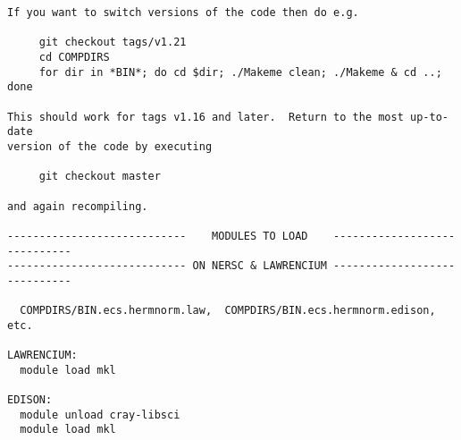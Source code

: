 \begin{verbatim}
If you want to switch versions of the code then do e.g.

     git checkout tags/v1.21
     cd COMPDIRS
     for dir in *BIN*; do cd $dir; ./Makeme clean; ./Makeme & cd ..; done

This should work for tags v1.16 and later.  Return to the most up-to-date 
version of the code by executing

     git checkout master

and again recompiling.

----------------------------    MODULES TO LOAD    -----------------------------
---------------------------- ON NERSC & LAWRENCIUM -----------------------------

  COMPDIRS/BIN.ecs.hermnorm.law,  COMPDIRS/BIN.ecs.hermnorm.edison, etc.

LAWRENCIUM:
  module load mkl

EDISON:
  module unload cray-libsci
  module load mkl
\end{verbatim}
